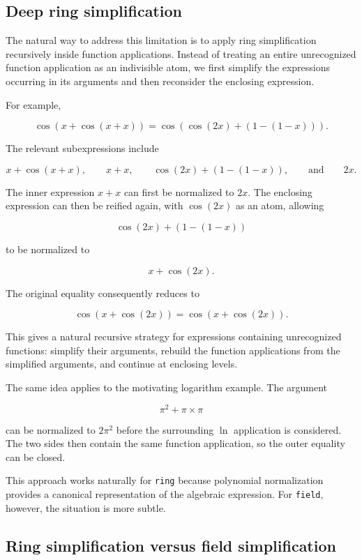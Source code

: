 \documentclass[11pt]{article}
\begin{document}
\subsection{Deep ring simplification}

The natural way to address this limitation is to apply ring simplification recursively inside function applications. Instead of treating an entire unrecognized function application as an indivisible atom, we first simplify the expressions occurring in its arguments and then reconsider the enclosing expression.

For example,

$$
  \cos(x+\cos(x+x))
  =
  \cos(\cos(2x)+(1-(1-x))).
$$

The relevant subexpressions include

$$
  x+\cos(x+x),\qquad
  x+x,\qquad
  \cos(2x)+(1-(1-x)),
  \qquad\text{and}\qquad
  2x.
$$

The inner expression $x+x$ can first be normalized to $2x$. The enclosing expression can then be reified again, with $\cos(2x)$ as an atom, allowing

$$
  \cos(2x)+(1-(1-x))
$$

to be normalized to

$$
  x+\cos(2x).
$$

The original equality consequently reduces to

$$
  \cos(x+\cos(2x))
  =
  \cos(x+\cos(2x)).
$$

This gives a natural recursive strategy for expressions containing unrecognized
functions: simplify their arguments, rebuild the function applications from
the simplified arguments, and continue at enclosing levels.

The same idea applies to the motivating logarithm example. The argument

$$
  \pi^2+\pi\mathbin{\times}\pi
$$

can be normalized to $2\pi^2$ before the surrounding $\ln$ application is considered. The two sides then contain the same function application, so the outer equality can be closed.

This approach works naturally for \texttt{ring} because polynomial normalization provides a canonical representation of the algebraic expression. For \texttt{field}, however, the situation is more subtle.

\subsection{Ring simplification versus field simplification}
\end{document}
